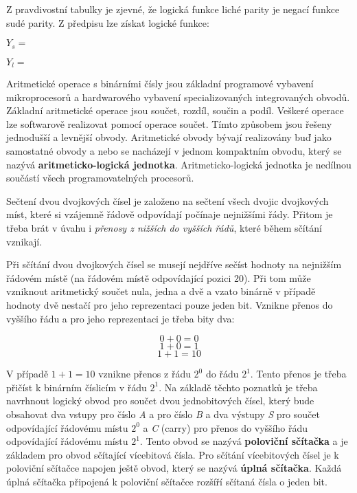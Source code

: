 Z pravdivostní tabulky je zjevné, že logická funkce liché parity je negací funkce sudé parity. Z předpisu lze získat logické funkce:

$Y_s = $

$Y_l = $ 



Aritmetické operace s binárními čísly jsou základní programové vybavení mikroprocesorů a hardwarového vybavení specializovaných integrovaných obvodů. Základní aritmetické operace jsou součet, rozdíl, součin a podíl. Veškeré operace lze softwarově realizovat pomocí operace součet. Tímto způsobem jsou řešeny jednodušší a levnější obvody. Aritmetické obvody bývají realizovány buď jako samostatné obvody a nebo se nacházejí v jednom kompaktním obvodu, který se nazývá {\bf aritmeticko-logická jednotka}. Aritmeticko-logická jednotka je nedílnou součástí všech programovatelných procesorů.


Sečtení dvou dvojkových čísel je založeno na sečtení všech dvojic dvojkových míst, které si vzájemně řádově odpovídají počínaje nejnižšími řády. Přitom je třeba brát v úvahu i {\it přenosy z nižších do vyšších řádů}, které během sčítání vznikají.

Při sčítání dvou dvojkových čísel se musejí nejdříve sečíst hodnoty na nejnižším řádovém místě (na řádovém místě odpovídající pozici 20). Při tom může vzniknout aritmetický součet nula, jedna a dvě a vzato binárně v případě hodnoty dvě nestačí pro jeho reprezentaci pouze jeden bit. Vznikne přenos do vyššího řádu a pro jeho reprezentaci je třeba bity dva:

$$ 0 + 0 = 0 $$
$$ 1 + 0 = 1 $$
$$ 1 + 1 = 10 $$

V případě $1+1=10$ vznikne přenos z řádu $2^0$ do řádu $2^1$. Tento přenos je třeba přičíst k binárním číslicím v řádu $2^1$. Na základě těchto poznatků je třeba navrhnout logický obvod pro součet dvou jednobitových čísel, který bude obsahovat dva vstupy pro číslo {\it A} a pro číslo {\it B} a dva výstupy {\it S} pro součet odpovídající řádovému místu $2^0$ a {\it C} (carry) pro přenos do vyššího řádu odpovídající řádovému místu $2^1$. Tento obvod se nazývá {\bf poloviční sčítačka} a je základem pro obvod sčítající vícebitová čísla. Pro sčítání vícebitových čísel je k poloviční sčítačce napojen ještě obvod, který se nazývá {\bf úplná sčítačka}. Každá úplná sčítačka připojená k poloviční sčítačce rozšíří sčítaná čísla o jeden bit.

